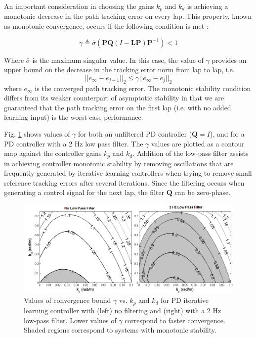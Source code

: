 \documentclass[letterpaper, 10 pt, conference]{ieeeconf}  %
\begin{document}
 An important consideration in choosing the gains $k_p$ and $k_d$ is achieving a monotonic decrease in the path tracking error on every lap. 
 This property, known as monotonic convergence, occurs if the following condition is met \cite{bristow}:

\begin{equation}
	\gamma \triangleq \bar{\sigma}(\mathbf{P}\mathbf{Q}(I-\mathbf{L}\mathbf{P})\mathbf{P}^{-1}) < 1
	\label{eq:MS}
\end{equation}
	
Where $\bar{\sigma}$ is the maximum singular value. In this case, the value of $\gamma$ provides an upper bound on the decrease in the tracking error norm from lap to lap, i.e. 
\begin{equation}
	||e_\infty - e_{j+1}||_2 \leq \gamma ||e_\infty-e_j||_2
\end{equation}
where $e_\infty$ is the converged path tracking error. The monotonic stability condition differs from its weaker counterpart of asymptotic stability in that we are guaranteed that 
 the path tracking error on the first lap (i.e. with no added learning input) is the worst case performance.

Fig. \ref{fig:stabPlot} shows values of $\gamma$ for both an unfiltered PD controller ($\mathbf{Q} = I$), and for a PD controller with a 2 Hz low pass filter. The $\gamma$ values are plotted as a
contour map against the controller gains $k_p$ and $k_d$. Addition of the low-pass filter
assists in achieving controller monotonic stability by removing oscillations that are frequently generated by iterative learning controllers when trying to remove small reference tracking
errors after several iterations. Since the filtering occurs when generating a control signal for the next lap, the filter $\mathbf{Q}$ can be zero-phase. 

\begin{figure}
\centering
\includegraphics[width=3.5 in]{figures/monotonicStability.png}
\caption{Values of convergence bound $\gamma$ vs. $k_p$ and $k_d$ for PD iterative learning controller with (left) no filtering and (right) with a 2 Hz low-pass filter. Lower values of $\gamma$ correspond to faster convergence.
Shaded regions correspond to systems with monotonic stability. }
\label{fig:stabPlot}
\end{figure}
\end{document}
